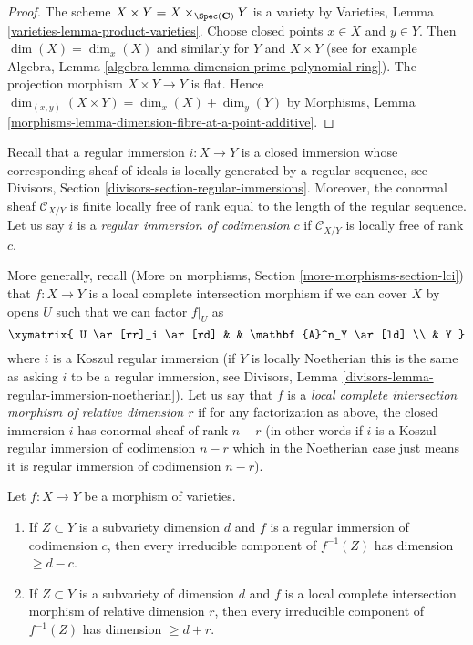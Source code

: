 \begin{proof}
The scheme $X \times Y = X \times_{\Spec(\mathbf{C})} Y$ is a variety by
Varieties, Lemma \ref{varieties-lemma-product-varieties}.
Choose closed points $x \in X$ and $y \in Y$.
Then $\dim(X) = \dim_x(X)$ and similarly for $Y$ and $X \times Y$
(see for example
Algebra, Lemma \ref{algebra-lemma-dimension-prime-polynomial-ring}).
The projection morphism $X \times Y \to Y$ is flat. Hence
$\dim_{(x, y)}(X \times Y) = \dim_x(X) + \dim_y(Y)$ by
Morphisms, Lemma \ref{morphisms-lemma-dimension-fibre-at-a-point-additive}.
\end{proof}

\medskip\noindent
Recall that a regular immersion $i : X \to Y$ is a closed immersion whose
corresponding sheaf of ideals is locally generated by a regular sequence, see
Divisors, Section \ref{divisors-section-regular-immersions}.
Moreover, the conormal sheaf $\mathcal{C}_{X/Y}$ is finite locally free of
rank equal to the length of the regular sequence. Let us say $i$ is a
{\it regular immersion of codimension $c$}
if $\mathcal{C}_{X/Y}$ is locally free of rank $c$.

\medskip\noindent
More generally, recall
(More on morphisms, Section \ref{more-morphisms-section-lci})
that $f : X \to Y$ is a local complete intersection
morphism if we can cover $X$ by opens $U$ such that we can factor
$f|_U$ as
$$
\xymatrix{
U \ar[rr]_i \ar[rd] & & \mathbf{A}^n_Y \ar[ld] \\
& Y
}
$$
where $i$ is a Koszul regular immersion (if $Y$ is locally Noetherian
this is the same as asking $i$ to be a regular immersion, see
Divisors, Lemma \ref{divisors-lemma-regular-immersion-noetherian}).
Let us say that $f$ is a {\it local complete intersection morphism
of relative dimension $r$} if for any factorization as above, the
closed immersion $i$ has conormal sheaf of rank $n - r$ (in other
words if $i$ is a Koszul-regular immersion of codimension $n - r$
which in the Noetherian case just means it is regular immersion of
codimension $n - r$).

\begin{lemma}
\label{lemma-pullback-by-regular-immersion}
Let $f : X \to Y$ be a morphism of varieties.
\begin{enumerate}
\item If $Z \subset Y$ is a subvariety dimension $d$ and $f$ is a regular
immersion of codimension $c$, then every irreducible component
of $f^{-1}(Z)$ has dimension $\geq d - c$.
\item If $Z \subset Y$ is a subvariety of dimension $d$ and
$f$ is a local complete intersection morphism of relative dimension $r$,
then every irreducible component of $f^{-1}(Z)$ has dimension $\geq d + r$.
\end{enumerate}
\end{lemma}


